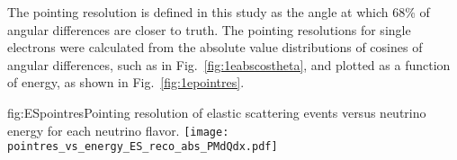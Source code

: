 The pointing resolution is defined in this study as the angle at which 68\% of angular differences are closer to truth. The pointing resolutions for single electrons were calculated from the absolute value distributions of cosines of angular differences, such as in Fig.~\ref{fig:1eabscostheta}, and plotted as a function of energy, as shown in Fig.~\ref{fig:1epointres}.




\begin{dunefigure}{fig:ESpointres}{Pointing resolution of elastic scattering events versus neutrino energy for each neutrino flavor.}
\texttt{[image: pointres\_vs\_energy\_ES\_reco\_abs\_PMdQdx.pdf]}
\end{dunefigure}






